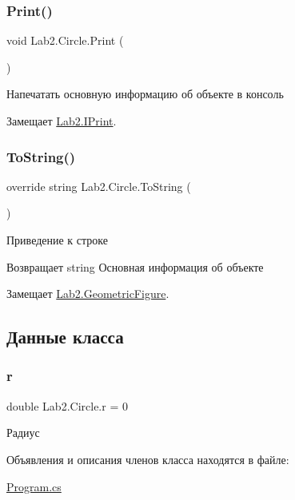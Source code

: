 \subsubsection{\texorpdfstring{Print()}{Print()}}
{\footnotesize\ttfamily void Lab2.\+Circle.\+Print (\begin{DoxyParamCaption}{ }\end{DoxyParamCaption})}

Напечатать основную информацию об объекте в консоль 

Замещает \hyperlink{interface_lab2_1_1_i_print_ab2ab78a92b129513c12b26f473d65c31}{Lab2.\+I\+Print}.

\mbox{\label{class_lab2_1_1_circle_ab2ed9c25791cb878a8a8d8857786917d}} 
\subsubsection{\texorpdfstring{To\+String()}{ToString()}}
{\footnotesize\ttfamily override string Lab2.\+Circle.\+To\+String (\begin{DoxyParamCaption}{ }\end{DoxyParamCaption})\hspace{0.3cm}{\ttfamily [virtual]}}

Приведение к строке \begin{DoxyReturn}{Возвращает}
string Основная информация об объекте 
\end{DoxyReturn}


Замещает \hyperlink{class_lab2_1_1_geometric_figure_a2f466edc438f43540ead2bc66925ef0a}{Lab2.\+Geometric\+Figure}.



\subsection{Данные класса}
\mbox{\label{class_lab2_1_1_circle_a5a40103bb404c90294370219a5cec078}} 
\subsubsection{\texorpdfstring{r}{r}}
{\footnotesize\ttfamily double Lab2.\+Circle.\+r = 0}



Радиус 



Объявления и описания членов класса находятся в файле\+:\begin{DoxyCompactItemize}
\item 
\hyperlink{_program_8cs}{Program.\+cs}\end{DoxyCompactItemize}
